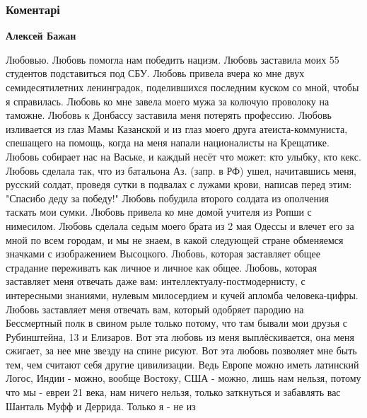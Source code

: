  
 
 
 
 
\subsubsection{Коментарі}

\begin{itemize} %
\textbf{Алексей Бажан} 

Любовью. Любовь помогла нам победить нацизм. Любовь заставила моих 55 студентов
подставиться под СБУ. Любовь привела вчера ко мне двух семидесятилетних
ленинградок, поделившихся последним куском со мной, чтобы я справилась. Любовь
ко мне завела моего мужа за колючую проволоку на таможне. Любовь к Донбассу
заставила меня потерять профессию. Любовь изливается из глаз Мамы Казанской и
из глаз моего друга атеиста-коммуниста, спешащего на помощь, когда на меня
напали националисты на Крещатике. Любовь собирает нас на Ваське, и каждый несёт
что может: кто улыбку, кто кекс. Любовь сделала так, что из батальона Аз.
(запр. в РФ) ушел, начитавшись меня, русский солдат, проведя сутки в подвалах с
лужами крови, написав перед этим: "Спасибо деду за победу!" Любовь побудила
второго солдата из ополчения таскать мои сумки. Любовь привела ко мне домой
учителя из Ропши с нимесилом. Любовь сделала седым моего брата из 2 мая Одессы
и влечет его за мной по всем городам, и мы не знаем, в какой следующей стране
обменяемся значками с изображением Высоцкого. Любовь, которая заставляет общее
страдание переживать как личное и личное как общее. Любовь, которая заставляет
меня отвечать даже вам: интеллектуалу-постмодернисту, с интересными знаниями,
нулевым милосердием и кучей апломба человека-цифры. Любовь заставляет меня
отвечать вам, который одобряет пародию на Бессмертный полк в свином рыле только
потому, что там бывали мои друзья с Рубинштейна, 13 и Елизаров. Вот эта любовь
из меня выплёскивается, она меня сжигает, за нее мне звезду на спине рисуют.
Вот эта любовь позволяет мне быть тем, чем считают себя другие цивилизации.
Ведь Европе можно иметь латинский Логос, Индии - можно, вообще Востоку, США -
можно, лишь нам нельзя, потому что мы - евреи 21 века, нам ничего нельзя,
только заткнуться и забавлять вас Шанталь Муфф и Деррида. Только я - не из

\end{itemize}
